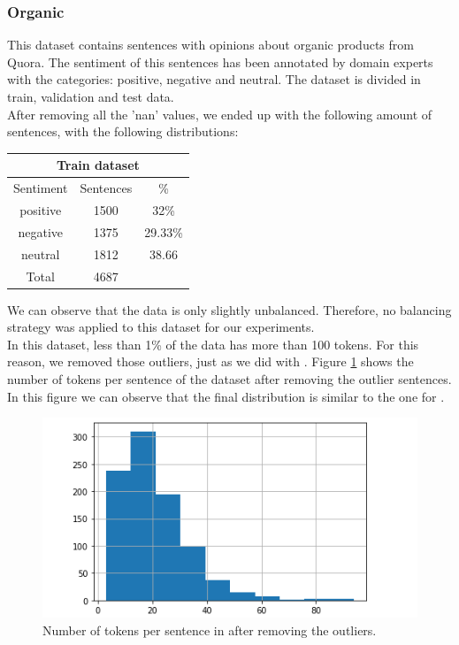 \subsubsection{Organic}
This dataset contains sentences with opinions about organic products from Quora. The sentiment of this sentences has been annotated by domain experts with the categories: positive, negative and neutral. The dataset is divided in train, validation and test data.\\
After removing all the 'nan' values, we ended up with the following amount of sentences, with the following distributions:
\begin{center}
 \begin{tabular}{||c c c||} 
 \multicolumn{3}{c}{\bf Train dataset} \\
 \hline
 Sentiment & Sentences & \%\\ [0.4ex] 
 \hline\hline
 positive & 1500 & 32\%\\ 
 \hline
 negative & 1375 & 29.33\%\\
 \hline
 neutral & 1812 & 38.66\\
 \hline\hline
 Total & 4687 & \\
 \hline
\end{tabular}
\end{center}
We can observe that the data is only slightly unbalanced. Therefore, no balancing strategy was applied to this dataset for our experiments.\\
In this dataset, less than 1\% of the data has more than 100 tokens. For this reason, we removed those outliers, just as we did with \dataEN. Figure \ref{organic_tokens_per_sentence} shows the number of tokens per sentence of the dataset after removing the outlier sentences. In this figure we can observe that the final distribution is similar to the one for \dataEN.
\begin{figure}[h]
\centerline{\includegraphics[scale=.5]{images/tokens_per_sentence_organic_after.png}}
\caption{Number of tokens per sentence in \dataORG after removing the outliers.}
\label{organic_tokens_per_sentence}
\end{figure}
